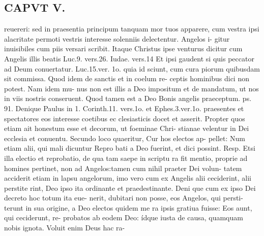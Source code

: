 \documentclass{article}
\begin{document}
\begin{pages}
\section*{CAPVT  V. }
\marginpar{[ p.333 ]}reuereri: sed in praesentia principum tanquam mor tuos apparere, cum vestra ipsi alacritate permoti vestris interesse solenniis delectentur. Angelos i- gitur inuisibiles cum piis versari scribit. Itaque Christus ipse venturus dicitur cum Angelis illis beatis Luc.9. vers.26. Iudae. vers.14 Et ipsi gaudent si quis peccator ad Deum conuertatur. Luc.15.ver. 1o. quia id sciunt, cum cura piorum quibusdam sit commissa. Quod idem de sanctis et in coelum re- ceptis hominibus dici non potest. Nam idem mu- nus non est illis a Deo impositum et de mandatum, ut nos in viis nostris conseruent. Quod tamen est a Deo Bonis angelis praeceptum. ps. 91. Denique Paulus in 1. Corinth.11. vers.1o. et Ephes.3.ver.1o. praesentes et spectatores eos interesse coetibus ec clesiasticis docet et asserit. Propter quos etiam ait honestum esse et decorum, ut foeminae Chri- stianae velentur in Dei ecclesia et conuentu. Secundo loco quaeritur, Cur hos electos ap- pellet: Num etiam alii, qui mali dicuntur Repro bati a Deo fuerint, et dici possint. Resp. Etsi illa electio et reprobatio, de qua tam saepe in scriptu ra fit mentio, proprie ad homines pertinet, non ad Angelos:tamen cum nihil praeter Dei volun- tatem acciderit etiam in lapsu angelorum, imo vero cum ex Angelis alii ceciderint, alii perstite rint, Deo ipso ita ordinante et praedestinante. Deni que cum ex ipso Dei decreto hoc totum ita eue- nerit, dubitari non posse, eos Angelos, qui persti- terunt in sua origine, a Deo electos quidem me ra ipsis gratiua fuisse: Eos aunt, qui ceciderunt, re- probatos ab eodem Deo: ídque iusta de causa, quamquam nobis ignota. Voluit enim Deus hac ra- 

\end{pages}
\end{document}
